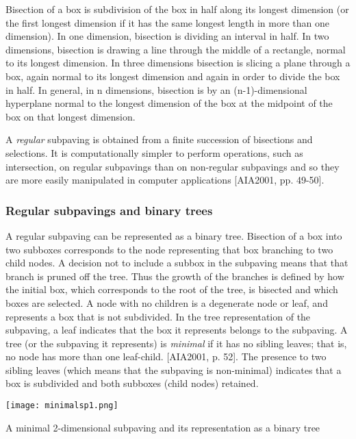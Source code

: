\-Bisection of a box is subdivision of the box in half along its longest dimension (or the first longest dimension if it has the same longest length in more than one dimension). \-In one dimension, bisection is dividing an interval in half. \-In two dimensions, bisection is drawing a line through the middle of a rectangle, normal to its longest dimension. \-In three dimensions bisection is slicing a plane through a box, again normal to its longest dimension and again in order to divide the box in half. \-In general, in n dimensions, bisection is by an (n-\/1)-\/dimensional hyperplane normal to the longest dimension of the box at the midpoint of the box on that longest dimension.

\-A {\itshape regular\/} subpaving is obtained from a finite succession of bisections and selections. \-It is computationally simpler to perform operations, such as intersection, on regular subpavings than on non-\/regular subpavings and so they are more easily manipulated in computer applications \mbox{[}\-A\-I\-A2001, pp. 49-\/50\mbox{]}.\hypertarget{pavproc_regsubpavs}{}\subsubsection{\-Regular subpavings and binary trees}\label{pavproc_regsubpavs}
\-A regular subpaving can be represented as a binary tree. \-Bisection of a box into two subboxes corresponds to the node representing that box branching to two child nodes. \-A decision not to include a subbox in the subpaving means that that branch is pruned off the tree. \-Thus the growth of the branches is defined by how the initial box, which corresponds to the root of the tree, is bisected and which boxes are selected. \-A node with no children is a degenerate node or leaf, and represents a box that is not subdivided. \-In the tree representation of the subpaving, a leaf indicates that the box it represents belongs to the subpaving. \-A tree (or the subpaving it represents) is {\itshape minimal\/} if it has no sibling leaves; that is, no node has more than one leaf-\/child. \mbox{[}\-A\-I\-A2001, p. 52\mbox{]}. \-The presence to two sibling leaves (which means that the subpaving is non-\/minimal) indicates that a box is subdivided and both subboxes (child nodes) retained.

 
\begin{DoxyImage}
\texttt{[image: minimalsp1.png]}
\caption{\-A minimal 2-\/dimensional subpaving and its representation as a binary tree}
\end{DoxyImage}




